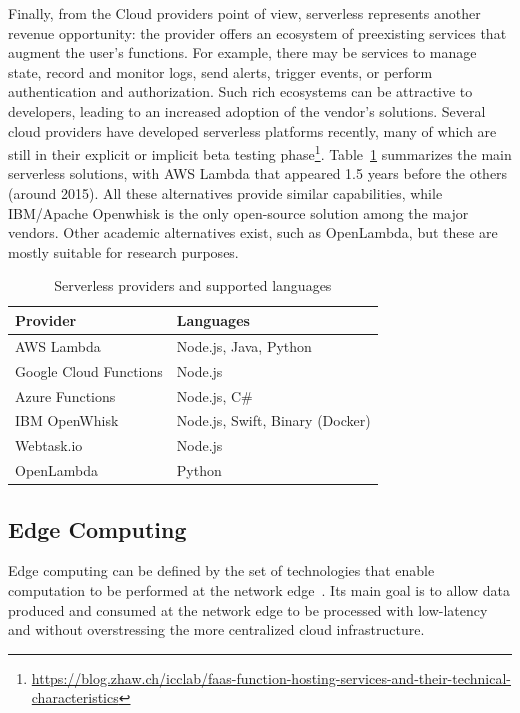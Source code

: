 Finally, from the Cloud providers point of view, serverless represents another revenue opportunity: the provider offers an ecosystem of preexisting services that augment the user's functions. For example, there may be services to manage state, record and monitor logs, send alerts, trigger events, or perform authentication and authorization. Such rich ecosystems can be attractive to developers, leading to an increased adoption of the vendor's solutions. Several cloud providers have developed serverless platforms recently, many of which are still in their explicit or implicit beta testing phase\footnote{\url{https://blog.zhaw.ch/icclab/faas-function-hosting-services-and-their-technical-characteristics}}. Table~\ref{tab:FaaS-providers-and} summarizes the main serverless solutions, with AWS Lambda that appeared 1.5 years before the others (around 2015). All these alternatives provide similar capabilities, while IBM/Apache Openwhisk is the only open-source solution among the major vendors. Other academic alternatives exist, such as OpenLambda\cite{Hendrickson:2016}, but these are mostly suitable for research purposes.

\begin{table}[hbt]
\centering
\caption{Serverless providers and supported languages\label{tab:FaaS-providers-and}}{
\begin{tabular}{ll}
\toprule 
\textbf{Provider} & \textbf{Languages}\tabularnewline
\midrule
AWS Lambda & Node.js, Java, Python\tabularnewline
Google Cloud Functions & Node.js\tabularnewline
Azure Functions & Node.js, C\#\tabularnewline
IBM OpenWhisk & Node.js, Swift, Binary (Docker)\tabularnewline
Webtask.io & Node.js\tabularnewline
OpenLambda & Python\tabularnewline
\bottomrule
\end{tabular}}
\end{table}



\subsection{Edge Computing}

Edge computing can be defined by the set of technologies that enable computation to be performed at the network edge~\cite{Shi:2016}. Its main goal is to allow data produced and consumed at the network edge to be processed with low-latency and without overstressing the more centralized cloud infrastructure.

